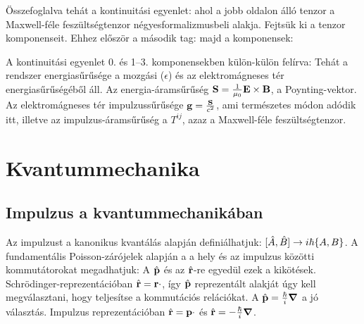    Összefoglalva tehát a kontinuitási egyenlet: 
   ahol a jobb oldalon álló tenzor a Maxwell-féle feszültségtenzor négyesformalizmusbeli alakja. Fejtsük ki a tenzor komponenseit. Ehhez  először a második tag:
   majd a komponensek:
   
   A kontinuitási egyenlet 0. és 1--3. komponensekben külön-külön felírva:
   Tehát a rendszer energiasűrűsége a mozgási ($\epsilon$) és az elektromágneses tér energiasűrűségéből áll. Az energia-áramsűrűség $\mathbf{S}=\frac{1}{\mu_0}\mathbf{E}\times\mathbf{B}$, a Poynting-vektor. Az elektromágneses tér impulzussűrűsége $\mathbf{g}=\frac{\mathbf{S}}{c^2}$, ami természetes módon adódik itt, illetve az impulzus-áramsűrűség a $T^{ij}$, azaz a Maxwell-féle feszültségtenzor.
   
 \section{Kvantummechanika}
  
  \subsection{Impulzus a kvantummechanikában}
   
   Az impulzust a kanonikus kvantálás alapján definiálhatjuk: $[\hat{A},\hat{B}]\to i\hbar\{A,B\}$. A fundamentális Poisson-zárójelek alapján a a hely és az impulzus közötti kommutátorokat megadhatjuk:
   A $\hat{\mathbf{p}}$ és az $\hat{\mathbf{r}}$-re egyedül ezek a kikötések. Schrödinger-reprezentációban $\hat{\mathbf{r}}=\mathbf{r}\cdot$, így $\hat{\mathbf{p}}$ reprezentált alakját úgy kell megválasztani, hogy teljesítse a kommutációs relációkat. A $\hat{\mathbf{p}}=\frac{\hbar}{i}\boldsymbol{\nabla}$ a jó választás. Impulzus reprezentációban $\hat{\mathbf{r}}=\mathbf{p}\cdot$ és $\hat{\mathbf{r}}=-\frac{\hbar}{i}\boldsymbol{\nabla}$. 
   
